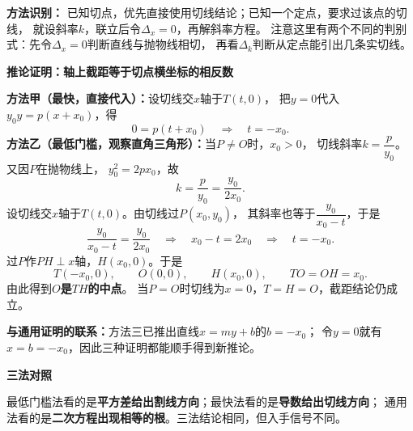 \begin{proofbox}
\textbf{方法识别：}
已知切点，优先直接使用切线结论；已知一个定点，要求过该点的切线，
就设斜率$k$，联立后令$\Delta_x=0$，再解斜率方程。
注意这里有两个不同的判别式：先令$\Delta_x=0$判断直线与抛物线相切，
再看$\Delta_k$判断从定点能引出几条实切线。

\medskip
\textbf{推论证明：轴上截距等于切点横坐标的相反数}

\textbf{方法甲（最快，直接代入）：}设切线交$x$轴于$T(t,0)$，
把$y=0$代入$y_0y=p(x+x_0)$，得
\[
  0=p(t+x_0)\quad\Longrightarrow\quad\boxed{t=-x_0}.
\]
\textbf{方法乙（最低门槛，观察直角三角形）：}当$P\ne O$时，$x_0>0$，
切线斜率$k=\dfrac{p}{y_0}$。又因$P$在抛物线上，
$y_0^2=2px_0$，故
\[
  k=\frac{p}{y_0}=\frac{y_0}{2x_0}.
\]
设切线交$x$轴于$T(t,0)$。由切线过$P(x_0,y_0)$，
其斜率也等于$\dfrac{y_0}{x_0-t}$，于是
\[
  \frac{y_0}{x_0-t}=\frac{y_0}{2x_0}
  \quad\Longrightarrow\quad x_0-t=2x_0
  \quad\Longrightarrow\quad\boxed{t=-x_0}.
\]
过$P$作$PH\perp x$轴，$H(x_0,0)$。于是
\[
  T(-x_0,0),\qquad O(0,0),\qquad H(x_0,0),
  \qquad TO=OH=x_0.
\]
由此得到\textbf{$O$是$TH$的中点}。
当$P=O$时切线为$x=0$，$T=H=O$，截距结论仍成立。

\textbf{与通用证明的联系：}方法三已推出直线$x=my+b$的$b=-x_0$；
令$y=0$就有$x=b=-x_0$，因此三种证明都能顺手得到新推论。

\medskip
\textbf{三法对照}

最低门槛法看的是\textbf{平方差给出割线方向}；最快法看的是\textbf{导数给出切线方向}；
通用法看的是\textbf{二次方程出现相等的根}。三法结论相同，但入手信号不同。
\end{proofbox}
